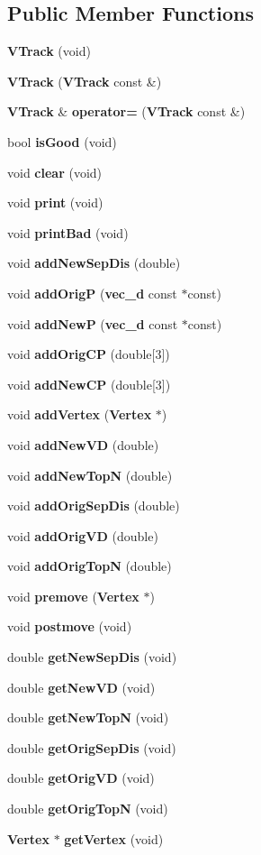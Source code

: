 \subsection*{Public Member Functions}
\begin{CompactItemize}
\item 
{\bf VTrack} (void)
\item 
{\bf VTrack} ({\bf VTrack} const \&)
\item 
{\bf VTrack} \& {\bf operator=} ({\bf VTrack} const \&)
\item 
bool {\bf is\-Good} (void)
\item 
void {\bf clear} (void)
\item 
void {\bf print} (void)
\item 
void {\bf print\-Bad} (void)
\item 
void {\bf add\-New\-Sep\-Dis} (double)
\item 
void {\bf add\-Orig\-P} ({\bf vec\_\-d} const $\ast$const)
\item 
void {\bf add\-New\-P} ({\bf vec\_\-d} const $\ast$const)
\item 
void {\bf add\-Orig\-CP} (double[3])
\item 
void {\bf add\-New\-CP} (double[3])
\item 
void {\bf add\-Vertex} ({\bf Vertex} $\ast$)
\item 
void {\bf add\-New\-VD} (double)
\item 
void {\bf add\-New\-Top\-N} (double)
\item 
void {\bf add\-Orig\-Sep\-Dis} (double)
\item 
void {\bf add\-Orig\-VD} (double)
\item 
void {\bf add\-Orig\-Top\-N} (double)
\item 
void {\bf premove} ({\bf Vertex} $\ast$)
\item 
void {\bf postmove} (void)
\item 
double {\bf get\-New\-Sep\-Dis} (void)
\item 
double {\bf get\-New\-VD} (void)
\item 
double {\bf get\-New\-Top\-N} (void)
\item 
double {\bf get\-Orig\-Sep\-Dis} (void)
\item 
double {\bf get\-Orig\-VD} (void)
\item 
double {\bf get\-Orig\-Top\-N} (void)
\item 
{\bf Vertex} $\ast$ {\bf get\-Vertex} (void)
\end{CompactItemize}


